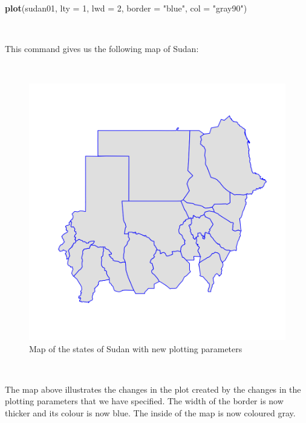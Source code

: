 \documentclass[12pt,a4paper,a4paper]{book}
\newenvironment{Shaded}{\begin{snugshade}}{\end{snugshade}}
\newcommand{\KeywordTok}[1]{\textcolor[rgb]{0.13,0.29,0.53}{\textbf{#1}}}
\newcommand{\DataTypeTok}[1]{\textcolor[rgb]{0.13,0.29,0.53}{#1}}
\newcommand{\DecValTok}[1]{\textcolor[rgb]{0.00,0.00,0.81}{#1}}
\newcommand{\StringTok}[1]{\textcolor[rgb]{0.31,0.60,0.02}{#1}}
\newcommand{\NormalTok}[1]{#1}
\theoremstyle{definition}
\theoremstyle{definition}
\theoremstyle{definition}
\theoremstyle{remark}
\begin{document}
~

\begin{Shaded}
\begin{Highlighting}[]
\KeywordTok{plot}\NormalTok{(sudan01, }\DataTypeTok{lty =} \DecValTok{1}\NormalTok{, }\DataTypeTok{lwd =} \DecValTok{2}\NormalTok{, }\DataTypeTok{border =} \StringTok{"blue"}\NormalTok{, }\DataTypeTok{col =} \StringTok{"gray90"}\NormalTok{)}
\end{Highlighting}
\end{Shaded}

~

This command gives us the following map of Sudan:

~

\begin{figure}[H]

{\centering \includegraphics{figures/map2-1} 

}

\caption{Map of the states of Sudan with new plotting parameters}\label{fig:map2}
\end{figure}

~

The map above illustrates the changes in the plot created by the changes
in the plotting parameters that we have specified. The width of the
border is now thicker and its colour is now blue. The inside of the map
is now coloured gray.
\end{document}
